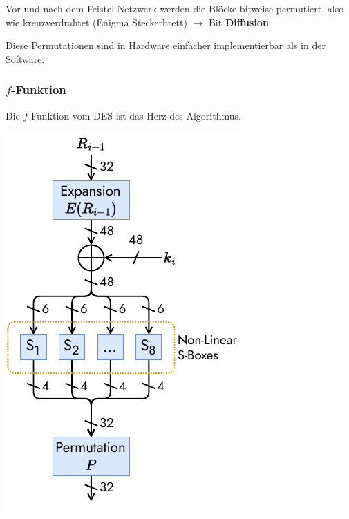 \documentclass[
  10pt,
  a4paper,
]{article}
\begin{document}
\begin{multicols*}{2}
Vor und nach dem Feistel Netzwerk werden die Blöcke bitweise permutiert,
also wie kreuzverdrahtet (Enigma Steckerbrett) \(\rightarrow\) Bit
\textbf{Diffusion}

\begin{tcolorbox}[enhanced jigsaw, coltitle=black, toprule=.15mm, colframe=quarto-callout-note-color-frame, breakable, titlerule=0mm, title=\textcolor{quarto-callout-note-color}{\faInfo}\hspace{0.5em}{Hinweis}, toptitle=1mm, colback=white, leftrule=.75mm, bottomtitle=1mm, colbacktitle=quarto-callout-note-color!10!white, left=2mm, bottomrule=.15mm, rightrule=.15mm, arc=.35mm, opacityback=0, opacitybacktitle=0.6]

Diese Permutationen sind in Hardware einfacher implementierbar als in
der Software.

\end{tcolorbox}

\subsubsection{\texorpdfstring{\(f\)-Funktion}{f-Funktion}}\label{f-funktion}

Die \(f\)-Funktion vom DES ist das Herz des Algorithmus.

\begin{center}
\includegraphics{images/crypto/des_ffunction.pdf}
\end{center}


\end{multicols*}
\end{document}
